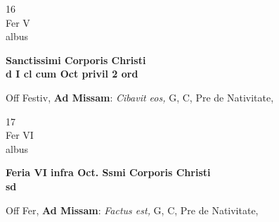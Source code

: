 \documentclass[10pt, openany]{book}
\begin{document}
        \begin{center}
            \begin{minipage}{3.5in}
                \vspace{2em}
                \begin{minipage}{0.5in}
                    {\Huge 16} \\
                    {\normalsize Fer V} \\
                    {\normalsize albus}
                \end{minipage}
                \begin{minipage}{3.0in}
                    \textbf{ \large Sanctissimi Corporis Christi \\
                    \textnormal{\normalsize d I cl cum Oct privil 2 ord}} \\ 
                \end{minipage}
                \begin{justify}Off Festiv, \textbf{Ad Missam}: \textit{Cibavit eos,} G, C, Pre de Nativitate,   
                \end{justify}
            \end{minipage}
        \end{center}
    
        \begin{center}
            \begin{minipage}{3.5in}
                \vspace{2em}
                \begin{minipage}{0.5in}
                    {\Huge 17} \\
                    {\normalsize Fer VI} \\
                    {\normalsize albus}
                \end{minipage}
                \begin{minipage}{3.0in}
                    \textbf{ \large Feria VI infra Oct. Ssmi Corporis Christi \\
                    \textnormal{\normalsize sd}} \\ 
                \end{minipage}
                \begin{justify}Off Fer, \textbf{Ad Missam}: \textit{Factus est,} G, C, Pre de Nativitate,   
                \end{justify}
            \end{minipage}
        \end{center}
    
\end{document}

